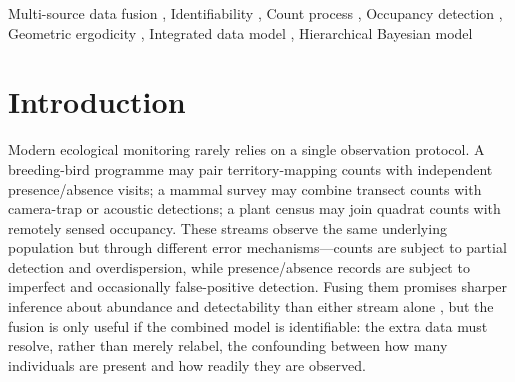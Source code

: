 \documentclass[preprint,12pt]{elsarticle}
\theoremstyle{definition}
\begin{document}
\begin{frontmatter}
\begin{abstract}
detection parameters with near-nominal coverage while improving latent-field prediction.
We then fit the model to real dual-channel mosquito surveillance data from the
National Ecological Observatory Network---overnight $\mathrm{CO}_2$-trap counts
and independent daytime-trap detections of a single vector species,
\emph{Coquillettidia perturbans}---recovering a coherent latent abundance field
whose detection parameters are identified by the informative species-specific
binary channel, exactly as the theory predicts, with the absolute abundance scale
anchored by design.
The manuscript is deliberately independent of flexible-kernel and algorithm-acceleration
developments: its contribution is the data-fusion likelihood, the conditional and local
identifiability theory, and the monitoring-design interpretation.
\end{abstract}

\begin{keyword}
Multi-source data fusion \sep
Identifiability \sep
Count process \sep
Occupancy detection \sep
Geometric ergodicity \sep
Integrated data model \sep
Hierarchical Bayesian model
\end{keyword}

\end{frontmatter}

\section{Introduction}
\label{sec:intro}

Modern ecological monitoring rarely relies on a single observation
protocol. A breeding-bird programme may pair territory-mapping counts with
independent presence/absence visits; a mammal survey may combine transect
counts with camera-trap or acoustic detections; a plant census may join
quadrat counts with remotely sensed occupancy. These streams observe the
same underlying population but through different error mechanisms---counts
are subject to partial detection and overdispersion, while
presence/absence records are subject to imperfect and occasionally
false-positive detection. Fusing them promises sharper inference about
abundance and detectability than either stream alone
\citep{kery2016,royle2004}, but the fusion is only useful if the combined
model is identifiable: the extra data must resolve, rather than merely
relabel, the confounding between how many individuals are present and how
readily they are observed.
\end{document}

